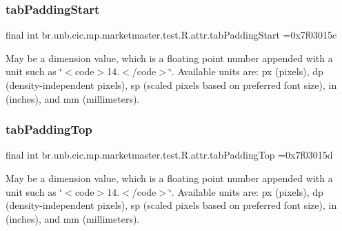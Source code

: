\subsubsection{\texorpdfstring{tab\+Padding\+Start}{tabPaddingStart}}
{\footnotesize\ttfamily final int br.\+unb.\+cic.\+mp.\+marketmaster.\+test.\+R.\+attr.\+tab\+Padding\+Start =0x7f03015c\hspace{0.3cm}{\ttfamily [static]}}

May be a dimension value, which is a floating point number appended with a unit such as \char`\"{}$<$code$>$14.\+5sp$<$/code$>$\char`\"{}. Available units are\+: px (pixels), dp (density-\/independent pixels), sp (scaled pixels based on preferred font size), in (inches), and mm (millimeters). \mbox{\label{classbr_1_1unb_1_1cic_1_1mp_1_1marketmaster_1_1test_1_1R_1_1attr_a22552ef59966d965336b3709a3ea1355}} 
\subsubsection{\texorpdfstring{tab\+Padding\+Top}{tabPaddingTop}}
{\footnotesize\ttfamily final int br.\+unb.\+cic.\+mp.\+marketmaster.\+test.\+R.\+attr.\+tab\+Padding\+Top =0x7f03015d\hspace{0.3cm}{\ttfamily [static]}}

May be a dimension value, which is a floating point number appended with a unit such as \char`\"{}$<$code$>$14.\+5sp$<$/code$>$\char`\"{}. Available units are\+: px (pixels), dp (density-\/independent pixels), sp (scaled pixels based on preferred font size), in (inches), and mm (millimeters). \mbox{\label{classbr_1_1unb_1_1cic_1_1mp_1_1marketmaster_1_1test_1_1R_1_1attr_af6dd9dfa879679c87a9e0abd21814608}} 

